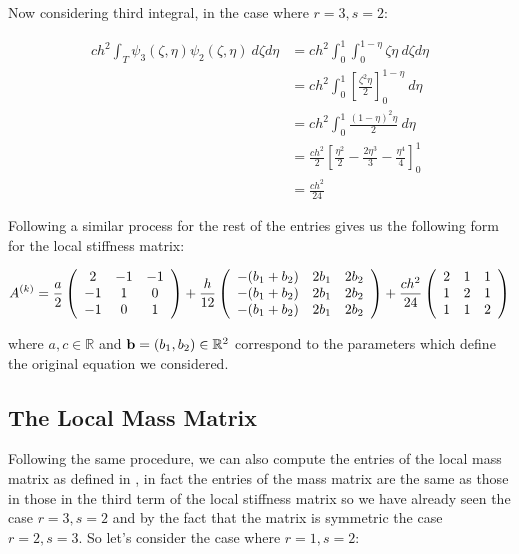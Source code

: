 Now considering third integral, in the case where $r = 3, s = 2$:

\begin{align*}
    ch^2\int_T\psi_3(\zeta,\eta)\psi_2(\zeta,\eta)\ d\zeta d\eta
    &= ch^2\int_0^1\int_0^{1-\eta}\zeta\eta\ d\zeta d\eta \\
    &= ch^2\int_0^1\left[\frac{\zeta^2\eta}{2}\right]_0^{1-\eta}\ d\eta \\
    &= ch^2\int_0^1\frac{(1-\eta)^2\eta}{2}\ d\eta \\
    &= \frac{ch^2}{2}\left[\frac{\eta^2}{2} - \frac{2\eta^3}{3} - \frac{\eta^4}{4}\right]_0^1 \\
    &= \frac{ch^2}{24}
\end{align*}

Following a similar process for the rest of the entries gives us the following
form for the local stiffness matrix:

\begin{equation}\label{eq:twod-local-stiffness}
 A^{(k)} =
    \frac{a}{2}\left(\begin{array}{c c c}
         2 & -1 & -1 \\
        -1 &  1 &  0 \\
        -1 &  0 &  1
    \end{array}\right)
    + \frac{h}{12} \left(\begin{array}{c c c}
        -(b_1 + b_2) & 2b_1 & 2b_2 \\
        -(b_1 + b_2) & 2b_1  & 2b_2 \\
        -(b_1 + b_2) & 2b_1  & 2b_2
    \end{array}\right)
    + \frac{ch^2}{24}\left(\begin{array}{c c c}
         2 &  1 &  1 \\
         1 &  2 &  1 \\
         1 &  1 &  2
      \end{array}\right)
\end{equation}

where $a, c \in \mathbb{R}$ and $\mathbf{b} = (b_1, b_2) \in \mathbb{R}^2$
correspond to the parameters which define the original equation
 we considered.

\subsection{The Local Mass Matrix}

Following the same procedure, we can also compute the entries of the local mass
matrix as defined in , in fact the
entries of the mass matrix are the same as those in those in the third term of
the local stiffness matrix so we have already seen the case $r = 3, s = 2$ and
by the fact that the matrix is symmetric the case $r = 2, s = 3$. So let's
consider the case where $r = 1, s = 2$:

